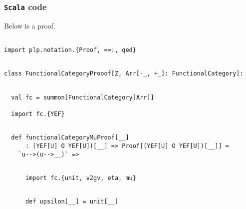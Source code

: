 \documentclass[11pt]{article}
\newcommand{\code}{\subsubsection{{\tt Scala} code}\begingroup\rm \vspace{12pt}}
\begin{document}
\code
Below is a proof.

\begin{mdframed}[backgroundcolor=lightgray!20] 
\begin{lstlisting}

import plp.notation.{Proof, ==:, qed}
\end{lstlisting}
\end{mdframed}
\vspace{6pt}
\begin{mdframed}[backgroundcolor=lightgray!20] 
\begin{lstlisting}

class FunctionalCategoryProoof[Z, Arr[-_, +_]: FunctionalCategory]:
\end{lstlisting}
\end{mdframed}
\vspace{6pt}
\begin{mdframed}[backgroundcolor=lightgray!20] 
\begin{lstlisting} 

  val fc = summon[FunctionalCategory[Arr]]

  import fc.{YEF}
\end{lstlisting}
\end{mdframed}
\vspace{6pt}
\clearpage
\begin{mdframed}[backgroundcolor=lightgray!20] 
\begin{lstlisting} 

  def functionalCategoryMuProof[__]
      : (YEF[U] O YEF[U])[__] => Proof[(YEF[U] O YEF[U])[__]] =
    `u-->(u-->__)` =>
\end{lstlisting}
\end{mdframed}
\vspace{6pt}
\begin{mdframed}[backgroundcolor=lightgray!20] 
\begin{lstlisting}

      import fc.{unit, v2gv, eta, mu}
\end{lstlisting}
\end{mdframed}
\vspace{6pt}
\begin{mdframed}[backgroundcolor=lightgray!20] 
\begin{lstlisting}
  
      def upsilon[__] = unit[__]
\end{lstlisting}
\end{mdframed}
\vspace{6pt}
\end{document}
